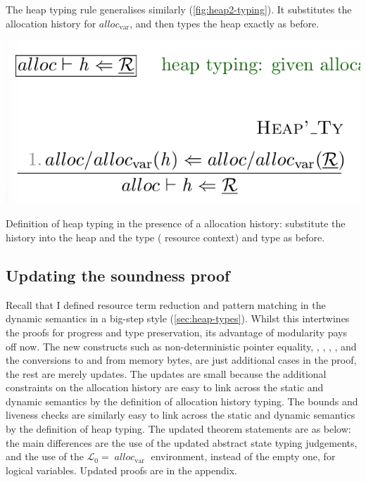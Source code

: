 The heap typing rule generalises similarly (\cref{fig:heap2-typing}). It
substitutes the allocation history for $\mathit{alloc}_\mathrm{var}$, and then
types the heap exactly as before.

\begin{marginfigure}
    \includegraphics{figures/heap2-typing}
    \caption{Definition of heap typing in the presence of a allocation history:
        substitute the history into the heap and the type (
        resource context) and type as before.}\label{fig:heap2-typing}
\end{marginfigure}

\subsection{Updating the soundness proof}

Recall that I defined resource term reduction and pattern matching in the
dynamic semantics in a big-step style (\cref{sec:heap-types}). Whilst this
intertwines the proofs for progress and type preservation, its advantage of
modularity pays off now. The new constructs such as non-deterministic pointer
equality, , ,
, , and the conversions
to and from memory bytes, are just additional cases in the proof, the rest are
merely updates. The updates are small because the additional
constraints on the allocation history are easy to link across the static and
dynamic semantics by the definition of allocation history typing. The bounds
and liveness checks are similarly easy to link across the static and dynamic
semantics by the definition of heap typing. The updated theorem statements are
as below: the main differences are the use of the updated abstract state typing
judgements, and the use of the $\mathcal{L}_0 = {\; \mathit{alloc}_\mathrm{var}
\;}$ environment, instead of the empty one, for logical variables. Updated
proofs are in the appendix.

